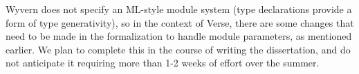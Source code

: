 Wyvern does not specify an ML-style module system (type declarations provide a form of type generativity), so in the context of Verse, there are some changes that need to be made in the formalization to handle module parameters, as mentioned earlier. We plan to complete this in the course of writing the dissertation, and do not anticipate it requiring more than 1-2 weeks of effort over the summer.


